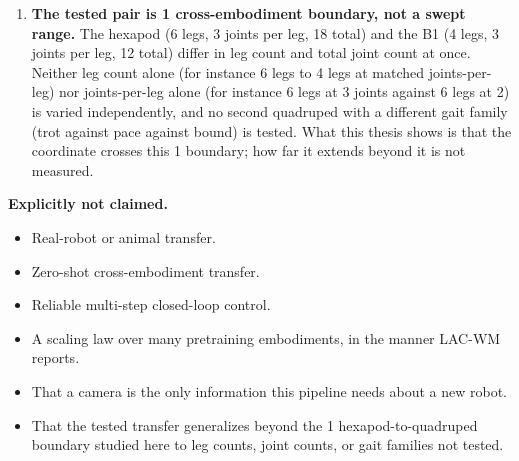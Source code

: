 \documentclass[12pt,a4paper,oneside]{report}
\begin{document}
\begin{enumerate}[label=\arabic*.]
\item \textbf{The tested pair is 1 cross-embodiment boundary, not a swept range.} The hexapod (6 legs, 3 joints
  per leg, 18 total) and the B1 (4 legs, 3 joints per leg, 12 total) differ in leg count and total joint count at
  once. Neither leg count alone (for instance 6 legs to 4 legs at matched joints-per-leg) nor joints-per-leg alone
  (for instance 6 legs at 3 joints against 6 legs at 2) is varied independently, and no second quadruped with a
  different gait family (trot against pace against bound) is tested. What this thesis shows is that the coordinate
  crosses this 1 boundary; how far it extends beyond it is not measured.
\end{enumerate}

\noindent\textbf{Explicitly not claimed.}
\begin{itemize}[label=--]
\item Real-robot or animal transfer.
\item Zero-shot cross-embodiment transfer.
\item Reliable multi-step closed-loop control.
\item A scaling law over many pretraining embodiments, in the manner LAC-WM reports.
\item That a camera is the only information this pipeline needs about a new robot.
\item That the tested transfer generalizes beyond the 1 hexapod-to-quadruped boundary studied here to leg
  counts, joint counts, or gait families not tested.
\end{itemize}
\end{document}
